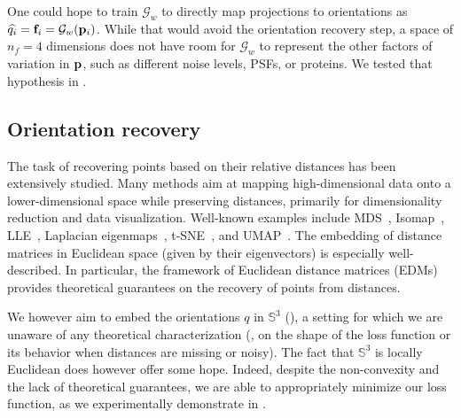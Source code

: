 One could hope to train $\mathcal{G}_w$ to directly map projections to orientations as $\widehat{q_i} = \mathbf{f}_i = \mathcal{G}_w(\mathbf{p}_i)$.
While that would avoid the orientation recovery step, a space of $n_f=4$ dimensions does not have room for $\mathcal{G}_w$ to represent the other factors of variation in $\mathbf{p}$, such as different noise levels, PSFs, or proteins.
We tested that hypothesis in .

\subsection{Orientation recovery}\label{sec:method:orientation-recovery}

The task of recovering points based on their relative distances has been extensively studied.
Many methods aim at mapping high-dimensional data onto a lower-dimensional space while preserving distances, primarily for dimensionality reduction and data visualization.
Well-known examples include MDS~\cite{cox2008mds}, Isomap~\cite{tenenbaum2000isomap}, LLE~\cite{roweis2000lle}, Laplacian eigenmaps~\cite{belkin2003laplacian}, t-SNE~\cite{maaten2008tsne}, and UMAP~\cite{mcinnes2018umap}.
The embedding of distance matrices in Euclidean space (given by their eigenvectors) is especially well-described.
In particular, the framework of Euclidean distance matrices (EDMs)~\cite{dokmanic2015edm} provides theoretical guarantees on the recovery of points from distances.

We however aim to embed the orientations $q$ in $\mathbb{S}^3$ (), a setting for which we are unaware of any theoretical characterization (\eg, on the shape of the loss function or its behavior when distances are missing or noisy).
The fact that $\mathbb{S}^3$ is locally Euclidean does however offer some hope. %
Indeed, despite the non-convexity and the lack of theoretical guarantees, we are able to appropriately minimize our loss function, as we experimentally demonstrate in .

